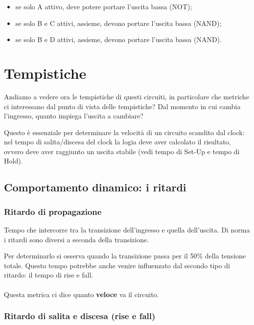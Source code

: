 \begin{itemize}
    \item se solo A attivo, deve potere portare l'uscita bassa (NOT);
    \item se solo B e C attivi, assieme, devono portare l'uscita bassa (NAND);
    \item se solo B e D attivi, assieme, devono portare l'uscita bassa (NAND).
\end{itemize}

\newpage
\section{Tempistiche}

Andiamo a vedere ora le tempistiche di questi circuiti, in particolare che metriche ci interessano dal punto di vista delle tempistiche? Dal momento in cui cambia l'ingresso, quanto impiega l'uscita a cambiare?

Questo è essenziale per determinare la velocità di un circuito scandito dal clock: nel tempo di salita/discesa del clock la logia deve aver calcolato il risultato, ovvero deve aver raggiunto un uscita stabile (vedi tempo di Set-Up e tempo di Hold).


\subsection{Comportamento dinamico: i ritardi}

\subsubsection{Ritardo di propagazione}
Tempo	che	intercorre	tra	
la	transizione	dell’ingresso	
e	quella	dell’uscita. Di	norma	i	ritardi	sono	
diversi	a	seconda	della	
transizione.

Per determinarlo si osserva quando la transizione  passa per il 50\% della tensione totale. Questo tempo potrebbe anche venire influenzato dal secondo tipo di ritardo: il tempo di rise e fall.

\paragraph{}
Questa metrica ci dice quanto \textbf{veloce} va il circuito.


\subsubsection{Ritardo di salita e discesa (rise e fall)}

